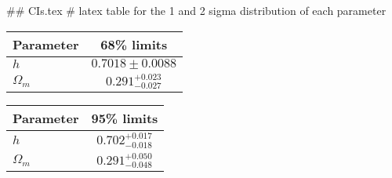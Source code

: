 ## CIs.tex
# latex table for the 1 and 2 sigma distribution of each parameter

\begin{tabular} { l  c}
 Parameter &  68\% limits\\
\hline
{\boldmath$h              $} & $0.7018\pm 0.0088          $\\
{\boldmath$\Omega_m       $} & $0.291^{+0.023}_{-0.027}   $\\
\hline
\end{tabular}

\begin{tabular} { l  c}
 Parameter &  95\% limits\\
\hline
{\boldmath$h              $} & $0.702^{+0.017}_{-0.018}   $\\
{\boldmath$\Omega_m       $} & $0.291^{+0.050}_{-0.048}   $\\
\hline
\end{tabular}
